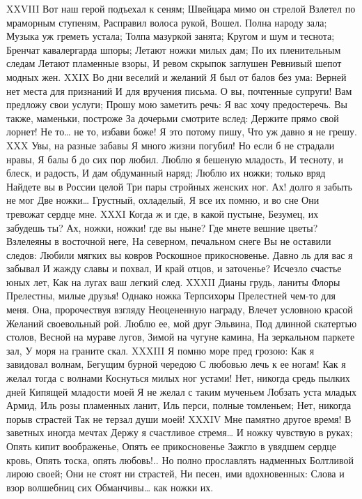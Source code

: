 XXVIII
Вот наш герой подъехал к сеням;
Швейцара мимо он стрелой
Взлетел по мраморным ступеням,
Расправил волоса рукой,
Вошел. Полна народу зала;
Музыка уж греметь устала;
Толпа мазуркой занята;
Кругом и шум и теснота;
Бренчат кавалергарда шпоры;
Летают ножки милых дам;
По их пленительным следам
Летают пламенные взоры,
И ревом скрыпок заглушен
Ревнивый шепот модных жен.
XXIX
Во дни веселий и желаний
Я был от балов без ума:
Верней нет места для признаний
И для вручения письма.
О вы, почтенные супруги!
Вам предложу свои услуги;
Прошу мою заметить речь:
Я вас хочу предостеречь.
Вы также, маменьки, построже
За дочерьми смотрите вслед:
Держите прямо свой лорнет!
Не то… не то, избави боже!
Я это потому пишу,
Что уж давно я не грешу.
XXX
Увы, на разные забавы
Я много жизни погубил!
Но если б не страдали нравы,
Я балы б до сих пор любил.
Люблю я бешеную младость,
И тесноту, и блеск, и радость,
И дам обдуманный наряд;
Люблю их ножки; только вряд
Найдете вы в России целой
Три пары стройных женских ног.
Ах! долго я забыть не мог
Две ножки… Грустный, охладелый,
Я все их помню, и во сне
Они тревожат сердце мне.
XXXI
Когда ж и где, в какой пустыне,
Безумец, их забудешь ты?
Ах, ножки, ножки! где вы ныне?
Где мнете вешние цветы?
Взлелеяны в восточной неге,
На северном, печальном снеге
Вы не оставили следов:
Любили мягких вы ковров
Роскошное прикосновенье.
Давно ль для вас я забывал
И жажду славы и похвал,
И край отцов, и заточенье?
Исчезло счастье юных лет,
Как на лугах ваш легкий след.
XXXII
Дианы грудь, ланиты Флоры
Прелестны, милые друзья!
Однако ножка Терпсихоры
Прелестней чем-то для меня.
Она, пророчествуя взгляду
Неоцененную награду,
Влечет условною красой
Желаний своевольный рой.
Люблю ее, мой друг Эльвина,
Под длинной скатертью столов,
Весной на мураве лугов,
Зимой на чугуне камина,
На зеркальном паркете зал,
У моря на граните скал.
XXXIII
Я помню море пред грозою:
Как я завидовал волнам,
Бегущим бурной чередою
С любовью лечь к ее ногам!
Как я желал тогда с волнами
Коснуться милых ног устами!
Нет, никогда средь пылких дней
Кипящей младости моей
Я не желал с таким мученьем
Лобзать уста младых Армид,
Иль розы пламенных ланит,
Иль перси, полные томленьем;
Нет, никогда порыв страстей
Так не терзал души моей!
XXXIV
Мне памятно другое время!
В заветных иногда мечтах
Держу я счастливое стремя…
И ножку чувствую в руках;
Опять кипит воображенье,
Опять ее прикосновенье
Зажгло в увядшем сердце кровь,
Опять тоска, опять любовь!..
Но полно прославлять надменных
Болтливой лирою своей;
Они не стоят ни страстей,
Ни песен, ими вдохновенных:
Слова и взор волшебниц сих
Обманчивы… как ножки их.
